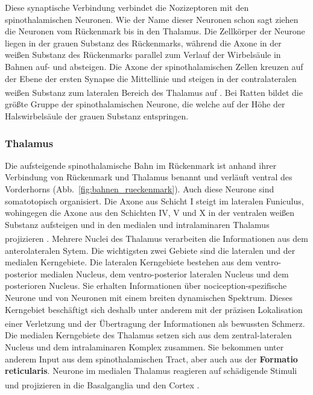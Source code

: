 \documentclass[12pt,a4paper,pdftex]{article}
\begin{document}
\newpage
Diese synaptische Verbindung verbindet die Nozizeptoren mit den spinothalamischen Neuronen. Wie der Name dieser Neuronen schon sagt ziehen die Neuronen vom Rückenmark bis in den Thalamus. Die Zellkörper der Neurone liegen in der grauen Substanz des Rückenmarks, während die Axone in der weißen Substanz des Rückenmarks parallel zum Verlauf der Wirbelsäule in Bahnen auf- und absteigen. Die Axone der spinothalamischen Zellen kreuzen auf der Ebene der ersten Synapse die Mittellinie und steigen in der contralateralen weißen Substanz zum lateralen Bereich des Thalamus auf \textsuperscript{\cite[25]{paxinos2014rat}}. Bei Ratten bildet die größte Gruppe der spinothalamischen Neurone, die welche auf der Höhe der Halswirbelsäule der grauen Substanz entspringen.


\subsubsection*{Thalamus}
Die aufsteigende spinothalamische Bahn  im Rückenmark ist anhand ihrer Verbindung von Rückenmark und Thalamus benannt und verläuft ventral des Vorderhorns  (Abb.~\ref{fig:bahnen_rueckenmark}). Auch diese Neurone sind somatotopisch organisiert. Die Axone aus Schicht I steigt im lateralen Funiculus, wohingegen die Axone aus den Schichten IV, V und X in der ventralen weißen Substanz aufsteigen und in den medialen und intralaminaren Thalamus projizieren \textsuperscript{\cite[25]{paxinos2014rat}}. 
Mehrere Nuclei des Thalamus verarbeiten die Informationen aus dem anterolateralen Sytem. Die wichtigsten zwei Gebiete sind die lateralen und der medialen Kerngebiete. 
Die lateralen Kerngebiete bestehen aus dem ventro-posterior medialen Nucleus, dem ventro-posterior lateralen Nucleus und dem posterioren Nucleus. Sie erhalten Informationen über nociception-spezifische Neurone und von Neuronen mit einem breiten dynamischen Spektrum. Dieses Kerngebiet beschäftigt sich deshalb unter anderem mit der präzisen Lokalisation einer Verletzung und der Übertragung der Informationen als bewussten Schmerz\textsuperscript{\cite[24]{kandel2013principles}}.
\\
\noindent Die medialen Kerngebiete des Thalamus setzen sich aus dem zentral-lateralen Nucleus und dem intralaminaren Komplex zusammen. Sie bekommen unter anderem Input aus dem spinothalamischen Tract, aber auch aus der \textbf{Formatio reticularis}. Neurone im medialen Thalamus reagieren auf schädigende Stimuli und projizieren in die Basalganglia und den Cortex \textsuperscript{\cite[24]{kandel2013principles}}.
\end{document}
